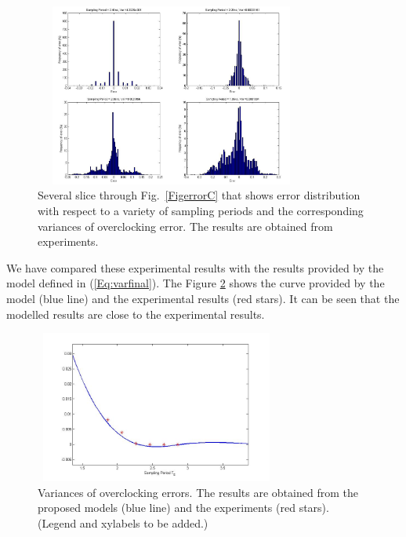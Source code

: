 \documentclass[journal]{IEEEtran}
\begin{document}
\begin{figure}[tbp]
\centering
	\includegraphics[width=9cm,height=6cm]{./Figures/gaussianOnlinedistr}
	\caption{Several slice through Fig.~\ref{FigerrorC} that shows error distribution with respect to a variety of sampling periods and the corresponding variances of overclocking error. The results are obtained from experiments.}
	\label{Fig:gaussianOnlinedistr}
\end{figure}




We have compared these experimental results with the results provided by the model defined in (\ref{Eq:varfinal}). The Figure \ref{Error_Function_Spline_experiment} shows the curve provided by the model (blue line) and the experimental results (red stars). It can be seen that the modelled results are close to the experimental results. 




\begin{figure}[tbp]
\centering
  \includegraphics[width=8cm,height=5cm]{./Figures/Error_Function_Spline_experiment}
  \caption{Variances of overclocking errors. The results are obtained from the proposed models (blue line) and the experiments (red stars). (Legend and xylabels to be added.) }\label{Error_Function_Spline_experiment}
\end{figure}
\end{document}

